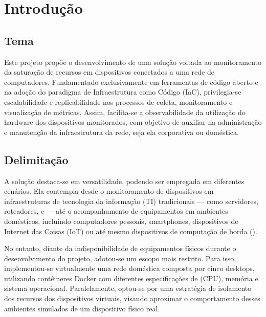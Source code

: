 \chapter{Introdução}
\label{chap1}

\section{Tema}

Este projeto propõe o desenvolvimento de uma solução voltada ao monitoramento da saturação de recursos em dispositivos conectados a uma rede de computadores. Fundamentado exclusivamente em ferramentas de código aberto e na adoção do paradigma de Infraestrutura como Código (IaC), privilegia-se escalabilidade e replicabilidade nos processos de coleta, monitoramento e visualização de métricas. Assim, facilita-se a observabilidade da utilização do hardware dos dispositivos monitorados, com objetivo de auxiliar na administração e manutenção da infraestrutura da rede, seja ela corporativa ou doméstica.

\section{Delimitação}
\label{section:Delimitação}

A solução destaca-se em versatilidade, podendo ser empregada em diferentes cenários. Ela contempla desde o monitoramento de dispositivos em infraestruturas de tecnologia da informação (TI) tradicionais — como servidores, roteadores,  e  — até o acompanhamento de equipamentos em ambientes domésticos, incluindo computadores pessoais, smartphones, dispositivos de Internet das Coisas (IoT) ou até mesmo dispositivos de computação de borda ().

No entanto, diante da indisponibilidade de equipamentos físicos durante o desenvolvimento do projeto, adotou-se um escopo mais restrito. Para isso, implementou-se virtualmente uma rede doméstica composta por cinco desktops, utilizando contêineres Docker com diferentes especificações de  (CPU), memória e sistema operacional. Paralelamente, optou-se por uma estratégia de isolamento dos recursos dos dispositivos virtuais, visando aproximar o comportamento desses ambientes simulados de um dispositivo físico real.

